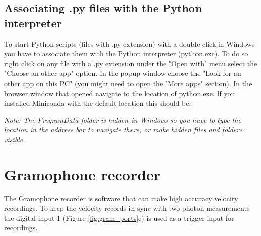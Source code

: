 \documentclass[11pt,a4paper]{article}
\newcommand{\enote}[1]{\textcolor{RubineRed}{#1}}
\newcommand{\note}[1]{\textit{Note: {#1}}}
\begin{document}
\subsection{Associating .py files with the Python interpreter}
To start Python scripts (files with .py extension) with a double click in Windows you have to associate them with the Python interpreter (python.exe). To do so right click on any file with a .py extension under the "Open with" menu select the "Choose an other app" option. In the popup window choose the "Look for an other app on this PC" (you might need to open the "More apps" section). In the browser window that opened navigate to the location of python.exe. If you installed Miniconda with the default location this should be: 

\note{The ProgramData folder is hidden in Windows so you have to type the location in the address bar to navigate there, or make hidden files and folders visible.}


%

\newpage
\section{Gramophone recorder} 
The Gramophone recorder is software that can make high accuracy velocity recordings. To keep the velocity records in sync with two-photon measurements the digital input 1 (Figure \ref{fig:gram_ports}c) is used as a trigger input for recordings. 
\end{document}
